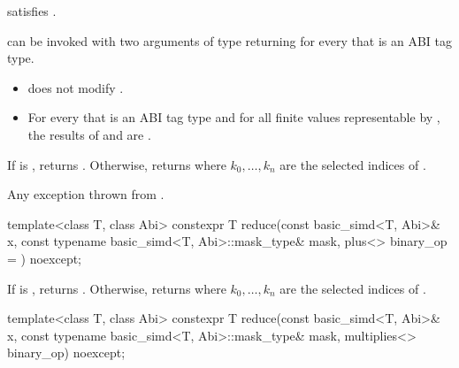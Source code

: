 \begin{itemdescr}
  \pnum\constraints
   satisfies .

  \pnum\mandates
   can be invoked with two arguments of type  returning
   for every  that is an ABI tag type.

  \pnum\expects
  \begin{itemize}
    \item {} does not modify .

    \item For every  that is an ABI tag type and for all finite
      values  representable by , the results of
       and  are .
  \end{itemize}

  \pnum\returns
  If  is , returns .
  Otherwise, returns  where $k_0, \ldots, k_n$ are the selected indices of
  .

  \pnum\throws
  Any exception thrown from .
\end{itemdescr}

\begin{itemdecl}
template<class T, class Abi>
  constexpr T reduce(const basic_simd<T, Abi>& x, const typename basic_simd<T, Abi>::mask_type& mask,
                     plus<> binary_op = {}) noexcept;
\end{itemdecl}

\begin{itemdescr}
  \pnum\returns
  If  is , returns . Otherwise, returns
   where $k_0, \ldots, k_n$ are the selected indices of .
\end{itemdescr}

\begin{itemdecl}
template<class T, class Abi>
  constexpr T reduce(const basic_simd<T, Abi>& x, const typename basic_simd<T, Abi>::mask_type& mask,
                     multiplies<> binary_op) noexcept;
\end{itemdecl}

